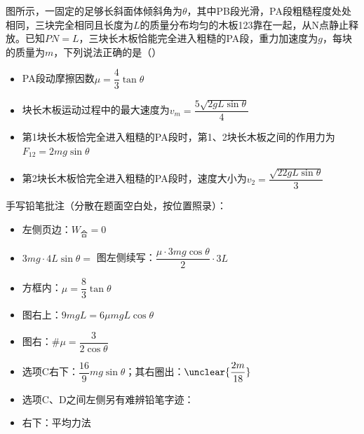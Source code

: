 \begin{problem}[贴纸印刷题]
图所示，一固定的足够长斜面体倾斜角为$\theta$，其中PB段光滑，PA段粗糙程度处处相同，三块完全相同且长度为$L$的质量分布均匀的木板123靠在一起，从N点静止释放。已知$PN=L$，三块长木板恰能完全进入粗糙的PA段，重力加速度为$g$，每块的质量为$m$，下列说法正确的是（） %

\begin{itemize}
\item[A.] PA段动摩擦因数$\mu=\dfrac{4}{3}\tan\theta$ %
\item[B.] 块长木板运动过程中的最大速度为$v_m=\dfrac{5\sqrt{2gL\sin\theta}}{4}$ %
\item[C.] 第1块长木板恰完全进入粗糙的PA段时，第1、2块长木板之间的作用力为$F_{12}=2mg\sin\theta$ %
\item[D.] 第2块长木板恰完全进入粗糙的PA段时，速度大小为$v_2=\dfrac{\sqrt{22gL\sin\theta}}{3}$ %
\end{itemize}


\begin{solution}
手写铅笔批注（分散在题面空白处，按位置照录）：
\begin{itemize}
\item 左侧页边：$W_{\text{合}}=0$
\item $3mg\cdot4L\sin\theta=$ \quad 图左侧续写：$\dfrac{\mu\cdot3mg\cos\theta}{2}\cdot3L$
\item 方框内：$\mu=\dfrac{8}{3}\tan\theta$
\item 图右上：$9mgL=6\mu mgL\cos\theta$ %
\item 图右：\#\quad $\mu=\dfrac{3}{2\cos\theta}$
\item 选项C右下：$\dfrac{16}{9}mg\sin\theta$；其右圈出：$\unclear{\dfrac{2m}{18}}$ %
\item 选项C、D之间左侧另有难辨铅笔字迹：
\item 右下：平均力法\ 
\end{itemize}
\end{solution}
\end{problem}
